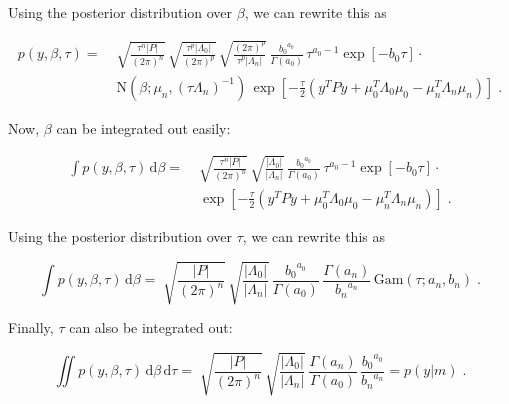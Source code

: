 Using the posterior distribution over $\beta$, we can rewrite this as

\vspace{-0.5em}
\begin{equation} \label{eq:GLM-NG-LME2}
\begin{split}
p(y,\beta,\tau) = \; & \sqrt{\frac{\tau^n |P|}{(2 \pi)^n}} \, \sqrt{\frac{\tau^p |\Lambda_0|}{(2 \pi)^p}} \, \sqrt{\frac{(2 \pi)^p}{\tau^p |\Lambda_n|}} \, \frac{{b_0}^{a_0}}{\Gamma(a_0)} \, \tau^{a_0-1} \exp[-b_0 \tau] \cdot \\
& \mathrm{N}(\beta; \mu_n, (\tau \Lambda_n)^{-1}) \, \exp\left[ -\frac{\tau}{2} (y^T P y + \mu_0^T \Lambda_0 \mu_0 - \mu_n^T \Lambda_n \mu_n) \right] \; .
\end{split}
\end{equation}

Now, $\beta$ can be integrated out easily:

\vspace{-0.5em}
\begin{equation} \label{eq:GLM-NG-LME3}
\begin{split}
\int p(y,\beta,\tau) \, \mathrm{d}\beta = \; & \sqrt{\frac{\tau^n |P|}{(2 \pi)^n}} \, \sqrt{\frac{|\Lambda_0|}{|\Lambda_n|}} \, \frac{{b_0}^{a_0}}{\Gamma(a_0)} \, \tau^{a_0-1} \exp[-b_0 \tau] \cdot \\
& \exp\left[ -\frac{\tau}{2} (y^T P y + \mu_0^T \Lambda_0 \mu_0 - \mu_n^T \Lambda_n \mu_n) \right] \; .
\end{split}
\end{equation}

Using the posterior distribution over $\tau$, we can rewrite this as

\begin{equation} \label{eq:GLM-NG-LME4}
\int p(y,\beta,\tau) \, \mathrm{d}\beta = \; \sqrt{\frac{|P|}{(2 \pi)^n}} \, \sqrt{\frac{|\Lambda_0|}{|\Lambda_n|}} \, \frac{{b_0}^{a_0}}{\Gamma(a_0)} \, \frac{\Gamma(a_n)}{{b_n}^{a_n}} \, \mathrm{Gam}(\tau; a_n, b_n) \; .
\end{equation}

Finally, $\tau$ can also be integrated out:

\begin{equation} \label{eq:GLM-NG-LME5}
\iint p(y,\beta,\tau) \, \mathrm{d}\beta \, \mathrm{d}\tau = \; \sqrt{\frac{|P|}{(2 \pi)^n}} \, \sqrt{\frac{|\Lambda_0|}{|\Lambda_n|}} \, \frac{\Gamma(a_n)}{\Gamma(a_0)} \, \frac{{b_0}^{a_0}}{{b_n}^{a_n}} = p(y|m) \; .
\end{equation}

